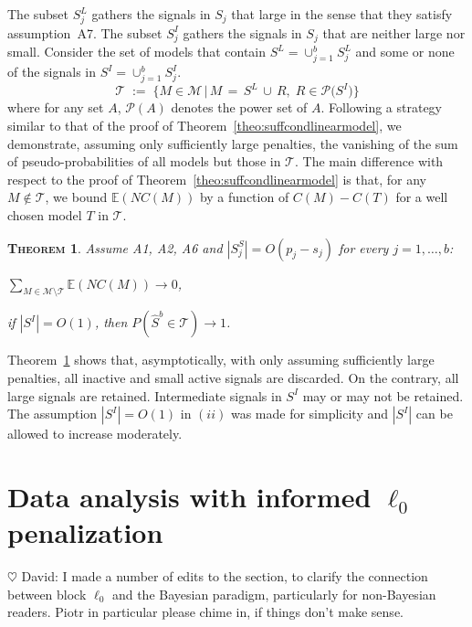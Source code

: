 \documentclass[aos]{imsart}
\theoremstyle{plain}
\newtheorem{thm}{\textsc{Theorem}}[section]
\newcommand{\david}[1]{{\small{\color{blue} \sf $\heartsuit$ David: #1}}}
\newcommand{\E}{\mathbb{E}}
\begin{document}
The subset $S_j^{L}$ gathers the signals in $S_j$ that large in the sense that they satisfy assumption~A7. The subset $S_j^{I}$ gathers the signals in $S_j$ that are neither large nor small. Consider the set of models that contain $S^L=\cup_{j=1}^b S^L_j$ and some or none of the signals in $S^I=\cup_{j=1}^b S^I_j$.
\begin{equation}
    \mathcal{T} \;:=\;\Big\{M \in \mathcal{M} \,\big|\, M\,=\, S^L\,\cup\,R,\; R\in \mathcal{P}\big(S^I\big)  \Big\}
\end{equation}
where for any set $A$, $ \mathcal{P}(A)$ denotes the power set of $A$.
Following a strategy similar to that of the proof of Theorem~\ref{theo:suffcondlinearmodel}, we demonstrate, assuming only sufficiently large penalties, the vanishing of the sum of pseudo-probabilities of all models but those in $\mathcal{T}$. The main difference with respect to the proof of Theorem~\ref{theo:suffcondlinearmodel} is that, for any $M\not\in \mathcal{T}$, we bound $\E(NC(M))$ by a function of $C(M)-C(T)$ for a well chosen model $T$ in $\mathcal{T}$. 
\begin{thm}\label{thm:convtoT}
    Assume A1, A2, A6 and $|S^S_j|=O(p_j-s_j)$ for every $j=1,\ldots,b$:
    \begin{longlist}
        \item $\sum_{M \in \mathcal{M}\setminus \mathcal{T}} \E\left(NC(M)\right)\to 0$,
        \item if $|S^I|=O(1)$, then $P(\hat{S}^b \in \mathcal{T})\to 1$.
    \end{longlist}
\end{thm}
Theorem~\ref{thm:convtoT} shows that, asymptotically, with only assuming sufficiently large penalties, all inactive and small active signals are discarded. On the contrary, all large signals are retained. Intermediate signals in $S^I$ may or may not be retained. The assumption $|S^I|=O(1)$ in $(ii)$ was made for simplicity and $|S^I|$ can be allowed to increase moderately. 

\section{Data analysis with informed $\ell_0$ penalization}\label{sec:informed_l0}

\david{I made a number of edits to the section, to clarify the connection between block $\ell_0$ and the Bayesian paradigm, particularly for non-Bayesian readers. Piotr in particular please chime in, if things don't make sense.}
\end{document}
